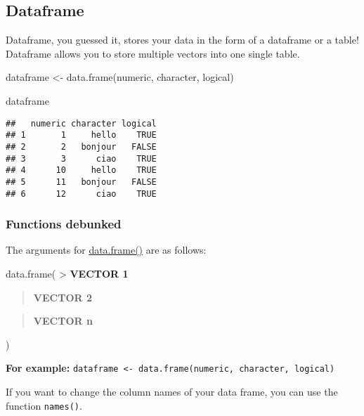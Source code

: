 \documentclass[
]{book}
\newenvironment{Shaded}{\begin{snugshade}}{\end{snugshade}}
\newcommand{\FunctionTok}[1]{\textcolor[rgb]{0.00,0.00,0.00}{#1}}
\newcommand{\NormalTok}[1]{#1}
\newcommand{\OtherTok}[1]{\textcolor[rgb]{0.56,0.35,0.01}{#1}}
\begin{document}
\hypertarget{dataframe}{%
\subsection{Dataframe}\label{dataframe}}

Dataframe, you guessed it, stores your data in the form of a dataframe or a table! Dataframe allows you to store multiple vectors into one single table.

\begin{Shaded}
\begin{Highlighting}[]
\NormalTok{dataframe }\OtherTok{\textless{}{-}} \FunctionTok{data.frame}\NormalTok{(numeric, character, logical)}
\end{Highlighting}
\end{Shaded}

\begin{Shaded}
\begin{Highlighting}[]
\NormalTok{dataframe}
\end{Highlighting}
\end{Shaded}

\begin{verbatim}
##   numeric character logical
## 1       1     hello    TRUE
## 2       2   bonjour   FALSE
## 3       3      ciao    TRUE
## 4      10     hello    TRUE
## 5      11   bonjour   FALSE
## 6      12      ciao    TRUE
\end{verbatim}

\hypertarget{functions-debunked-2}{%
\subsubsection{Functions debunked}\label{functions-debunked-2}}

The arguments for \href{https://www.rdocumentation.org/packages/base/versions/3.6.2/topics/data.frame}{data.frame()} are as follows:

data.frame(
\textgreater{} \textbf{VECTOR 1}

\begin{quote}
\textbf{VECTOR 2}
\end{quote}

\begin{quote}
\textbf{VECTOR n}
\end{quote}

)

\textbf{For example:} \texttt{dataframe\ \textless{}-\ data.frame(numeric,\ character,\ logical)}

If you want to change the column names of your data frame, you can use the function \texttt{names()}.
\end{document}
